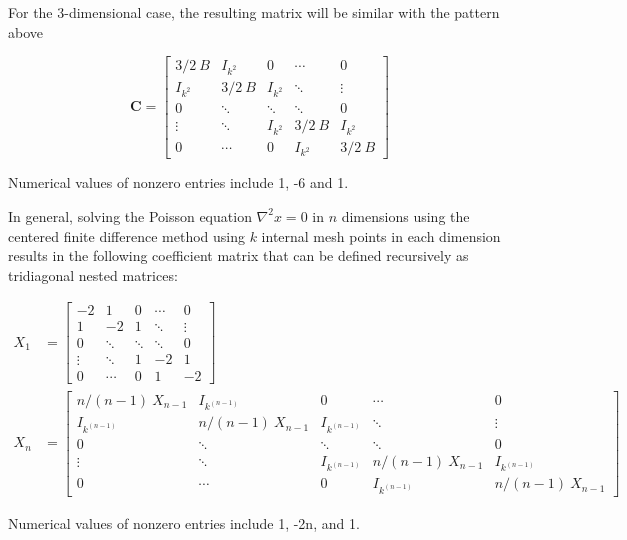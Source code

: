 \documentclass[a4paper, 11pt]{article}
\begin{document}
	For the 3-dimensional case, the resulting matrix will be similar with the pattern above
	
	\begin{equation*}
	\mathbf{C} =
	\begin{bmatrix}
	3/2\:B & I_{k^2} & 0 & \cdots & 0\\
	I_{k^2} & 3/2\:B & I_{k^2} & \ddots & \vdots\\
	0 & \ddots & \ddots & \ddots & 0\\
	\vdots & \ddots & I_{k^2} & 3/2\:B & I_{k^2}\\
	0 & \cdots & 0 & I_{k^2} & 3/2\:B
	\end{bmatrix}
	\end{equation*}
	
	Numerical values of nonzero entries include 1, -6 and 1.
	
	In general, solving the Poisson equation $\nabla^2 x=0$ in $n$ dimensions using the centered finite difference method using $k$ internal mesh points in each dimension results in the following coefficient matrix that can be defined recursively as tridiagonal nested matrices:
	
	\begin{align*}
	X_1 &= 
	\begin{bmatrix}
	-2    & 1     & 0     & \cdots& 0 \\
	1     & -2    & 1     & \ddots& \vdots \\
	0     & \ddots     & \ddots    & \ddots     & 0 \\
	\vdots& \ddots     & 1     & -2    & 1 \\
	0     & \cdots     & 0     & 1     & -2
	\end{bmatrix}\\
	X_n &=
	\begin{bmatrix}
	n/(n-1)\:X_{n-1} & I_{k^{(n-1)}} & 0 & \cdots & 0\\
	I_{k^{(n-1)}} & n/(n-1)\:X_{n-1} & I_{k^{(n-1)}} & \ddots & \vdots\\
	0 & \ddots & \ddots & \ddots & 0\\
	\vdots & \ddots & I_{k^{(n-1)}} & n/(n-1)\:X_{n-1} & I_{k^{(n-1)}}\\
	0 & \cdots & 0 & I_{k^{(n-1)}} & n/(n-1)\:X_{n-1}
	\end{bmatrix}
	\end{align*}
	
	Numerical values of nonzero entries include 1, -2n, and 1.
	
	
\end{document}
